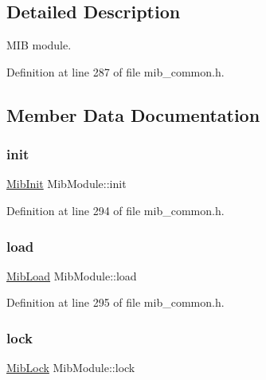 \subsection{Detailed Description}
M\+IB module. 

Definition at line 287 of file mib\+\_\+common.\+h.



\subsection{Member Data Documentation}
\mbox{\label{structMibModule_ae58f1679aef20da90eb1ed4240f04f37}} 
\subsubsection{\texorpdfstring{init}{init}}
{\footnotesize\ttfamily \hyperlink{mib__common_8h_aff33708fc9095fa6f4b07e83b3e3296f}{Mib\+Init} Mib\+Module\+::init}



Definition at line 294 of file mib\+\_\+common.\+h.

\mbox{\label{structMibModule_a01077b888aea380f8d383a992aea0efa}} 
\subsubsection{\texorpdfstring{load}{load}}
{\footnotesize\ttfamily \hyperlink{mib__common_8h_ab9c66331b8c2f51d4a41907905069339}{Mib\+Load} Mib\+Module\+::load}



Definition at line 295 of file mib\+\_\+common.\+h.

\mbox{\label{structMibModule_a261fb38e912ea09684b79450e432d1d7}} 
\subsubsection{\texorpdfstring{lock}{lock}}
{\footnotesize\ttfamily \hyperlink{mib__common_8h_a7c0490582ba39a77cc6c647c5260adb3}{Mib\+Lock} Mib\+Module\+::lock}



